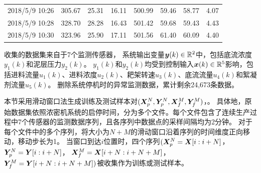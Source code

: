 \begin{table}[ht]
{\begin{tabular}{cccccccc}
2018/5/9 10:26 & 305.67                                                    & 25.31                                                         & 16.11                                                   & 500.99                                                                                                                                                  & 59.46                                                     & 58.77                                   &4.07                          \\
2018/5/9 10:28 & 328.70                                                    & 28.28                                                         & 16.43                                                   & 501.42                                                                                                                                                  & 59.68                                                     & 59.43                                   &4.43                          \\
2018/5/9 10:30 & 323.96                                                    & 25.90                                                         & 17.11                                                   & 501.56                                                                                                                                                  & 61.40                                                     & 60.09                                   &4.40                          \\
\bottomrule
\end{tabular}}
\end{table}
收集的数据集来自于7个监测传感器，
系统输出变量$\boldsymbol y(k) \in \mathbb{R}^2$中，包括底流浓度$y_1(k)$和泥层压力$y_2(k)$。
$y_1(k)$和$y_2(k)$均受到控制输入$\boldsymbol x(k)\in \mathbb{R}^5$影响，包括进料流量$u_1(k)$、进料浓度$u_2(k)$、耙架转速$u_3(k)$、底流流量$u_4(k)$和絮凝剂流量$u_5(k)$。
删除系统停机时的异常监测数据，累计剩余24,673条数据。

本节采用滑动窗口法生成训练及测试样本对$(\boldsymbol X _p^N, \boldsymbol Y _p^N, \boldsymbol X _f^M, \boldsymbol Y _f^M)$，。
具体地，原始数据集依照浓密机系统的启停时间，分为多个文件。每个文件包含了连续生产过程中7个传感器的监测数据序列，且各序列中数据点的采样间隔均为2分钟。
对于每个文件中的多个序列，将大小为$N+M$的滑动窗口沿着序列的时间维度正向移动，移动步长为1。
当窗口到达$i$位置时，四个序列$(\boldsymbol X _p^N =\boldsymbol X[i:i+N]$， $\boldsymbol Y _p^N =\boldsymbol Y[i:i+N]$， $\boldsymbol X _f^M=\boldsymbol X[i+N:i+N+M]$， $\boldsymbol Y _f^M=\boldsymbol Y[i+N:i+N+M])$被收集作为训练或测试样本。

